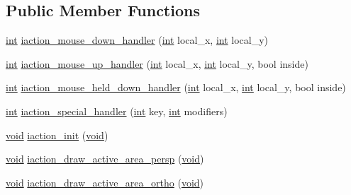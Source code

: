 \subsection*{Public Member Functions}
\begin{DoxyCompactItemize}
\item 
\hyperlink{wglext_8h_a500a82aecba06f4550f6849b8099ca21}{int} \hyperlink{class_g_l_u_i___rotation_a3af15515b4f2bd05bfbbc625fa4d6247}{iaction\+\_\+mouse\+\_\+down\+\_\+handler} (\hyperlink{wglext_8h_a500a82aecba06f4550f6849b8099ca21}{int} local\+\_\+x, \hyperlink{wglext_8h_a500a82aecba06f4550f6849b8099ca21}{int} local\+\_\+y)
\item 
\hyperlink{wglext_8h_a500a82aecba06f4550f6849b8099ca21}{int} \hyperlink{class_g_l_u_i___rotation_aa3ee9f07c589dedc7c1b6ad780566172}{iaction\+\_\+mouse\+\_\+up\+\_\+handler} (\hyperlink{wglext_8h_a500a82aecba06f4550f6849b8099ca21}{int} local\+\_\+x, \hyperlink{wglext_8h_a500a82aecba06f4550f6849b8099ca21}{int} local\+\_\+y, bool inside)
\item 
\hyperlink{wglext_8h_a500a82aecba06f4550f6849b8099ca21}{int} \hyperlink{class_g_l_u_i___rotation_ad743bdbd88648859ef334c572e9e969d}{iaction\+\_\+mouse\+\_\+held\+\_\+down\+\_\+handler} (\hyperlink{wglext_8h_a500a82aecba06f4550f6849b8099ca21}{int} local\+\_\+x, \hyperlink{wglext_8h_a500a82aecba06f4550f6849b8099ca21}{int} local\+\_\+y, bool inside)
\item 
\hyperlink{wglext_8h_a500a82aecba06f4550f6849b8099ca21}{int} \hyperlink{class_g_l_u_i___rotation_a0a86badfaa9102475a2af2b2f3d824aa}{iaction\+\_\+special\+\_\+handler} (\hyperlink{wglext_8h_a500a82aecba06f4550f6849b8099ca21}{int} key, \hyperlink{wglext_8h_a500a82aecba06f4550f6849b8099ca21}{int} modifiers)
\item 
\hyperlink{wglext_8h_a9e6b7f1933461ef318bb000d6bd13b83}{void} \hyperlink{class_g_l_u_i___rotation_ac7029bd29427238e2590472ae882c258}{iaction\+\_\+init} (\hyperlink{wglext_8h_a9e6b7f1933461ef318bb000d6bd13b83}{void})
\item 
\hyperlink{wglext_8h_a9e6b7f1933461ef318bb000d6bd13b83}{void} \hyperlink{class_g_l_u_i___rotation_a88cf2f55e52c4afc9a81fceb53dbc406}{iaction\+\_\+draw\+\_\+active\+\_\+area\+\_\+persp} (\hyperlink{wglext_8h_a9e6b7f1933461ef318bb000d6bd13b83}{void})
\item 
\hyperlink{wglext_8h_a9e6b7f1933461ef318bb000d6bd13b83}{void} \hyperlink{class_g_l_u_i___rotation_aea8411d09fec628a8af788b0998746f2}{iaction\+\_\+draw\+\_\+active\+\_\+area\+\_\+ortho} (\hyperlink{wglext_8h_a9e6b7f1933461ef318bb000d6bd13b83}{void})

\end{DoxyCompactItemize}
